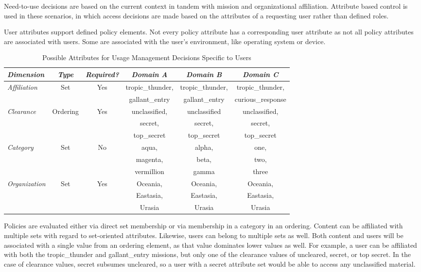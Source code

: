Need-to-use decisions are based on the current context in tandem with mission and organizational affiliation.  Attribute based control is used in these scenarios, in which access decisions are made based on the attributes of a requesting user rather than defined roles.

User attributes support defined policy elements.  Not every policy attribute has a corresponding user attribute as not all policy attributes are associated with users.  Some are associated with the user's environment, like operating system or device.

\begin{table*}[tp] %
\centering %
\begin{tabular}{lccccc}
\toprule %
\emph{Dimension}		& \emph{Type}	& \emph{Required?}	& \emph{Domain A}	& \emph{Domain B}	& \emph{Domain C} 	\\\toprule
\emph{Affiliation} 	& Set 			& Yes 				& tropic\_thunder, 	& tropic\_thunder,	& tropic\_thunder, 	\\
					&				&					& gallant\_entry		& gallant\_entry		& curious\_response	\\\midrule
\emph{Clearance} 	& Ordering 		& Yes 				& unclassified,		& unclassified		& unclassified,		\\
					&				&					& secret,			& secret,			& secret,			\\
					&				&					& top\_secret		& top\_secret		& top\_secret		\\\midrule
\emph{Category}		& Set 			& No 				& aqua,				& alpha,				& one,				\\
					&				&					& magenta,			& beta,				& two,				\\
					&				&					& vermillion			& gamma				& three				\\\midrule
\emph{Organization}	& Set 			& Yes 				& Oceania, 			& Oceania,			& Oceania,			\\
					&				&					& Eastasia,			& Eastasia,			& Eastasia,			\\
					&				&					& Urasia				& Urasia				& Urasia				\\\midrule
\end{tabular}
\caption{Possible Attributes for Usage Management Decisions Specific to Users}
\label{table:model:user-attributes}
\end{table*}

Policies are evaluated either via direct set membership or via membership in a category in an ordering.  Content can be affiliated with multiple sets with regard to set-oriented attributes.  Likewise, users can belong to multiple sets as well.  Both content and users will be associated with a single value from an ordering element, as that value dominates lower values as well.  For example, a user can be affiliated with both the tropic\_thunder and gallant\_entry missions, but only one of the clearance values of uncleared, secret, or top secret.  In the case of clearance values, secret subsumes uncleared, so a user with a secret attribute set would be able to access any unclassified material.


